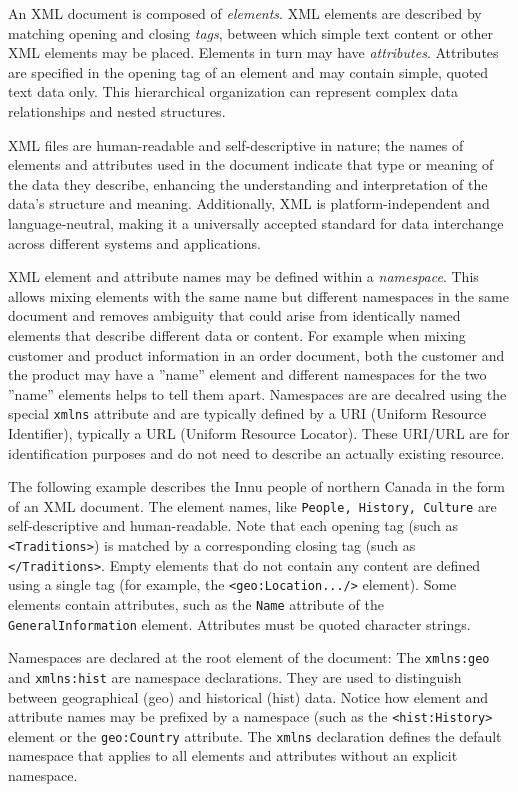 An XML document is composed of \emph{elements}. XML elements are described by matching opening and closing \emph{tags}, between which simple text content or other XML elements may be placed. Elements in turn may have \emph{attributes}. Attributes are specified in the opening tag of an element and may contain simple, quoted text data only. This hierarchical organization can represent complex data relationships and nested structures. 

XML files are human-readable and self-descriptive in nature; the names of elements and attributes used in the document indicate that type or meaning of the data they describe, enhancing the understanding and interpretation of the data's structure and meaning. Additionally, XML is platform-independent and language-neutral, making it a universally accepted standard for data interchange across different systems and applications. 

XML element and attribute names may be defined within a \emph{namespace}. This allows mixing elements with the same name but different namespaces in the same document and removes ambiguity that could arise from identically named elements that describe different data or content. For example when mixing customer and product information in an order document, both the customer and the product may have a ''name'' element and different namespaces for the two ''name'' elements helps to tell them apart. Namespaces are are decalred using the special \texttt{xmlns} attribute and are typically defined by a URI (Uniform Resource Identifier), typically a URL (Uniform Resource Locator). These URI/URL are for identification purposes and do not need to describe an actually existing resource.

The following example describes the Innu people of northern Canada in the form of an XML document. The element names, like \texttt{People, History, Culture} are self-descriptive and human-readable. Note that each opening tag (such as \texttt{<Traditions>}) is matched by a corresponding closing tag (such as \texttt{</Traditions>}. Empty elements that do not contain any content are defined using a single tag (for example, the \texttt{<geo:Location.../>} element). Some elements contain attributes, such as the \texttt{Name} attribute of the \texttt{GeneralInformation} element. Attributes must be quoted character strings.

Namespaces are declared at the root element of the document: The \texttt{xmlns:geo} and \texttt{xmlns:hist} are namespace declarations. They are used to distinguish between geographical (geo) and historical (hist) data. Notice how element and attribute names may be prefixed by a namespace (such as the \texttt{<hist:History>} element or the \texttt{geo:Country} attribute. The \texttt{xmlns} declaration defines the default namespace that applies to all elements and attributes without an explicit namespace.

